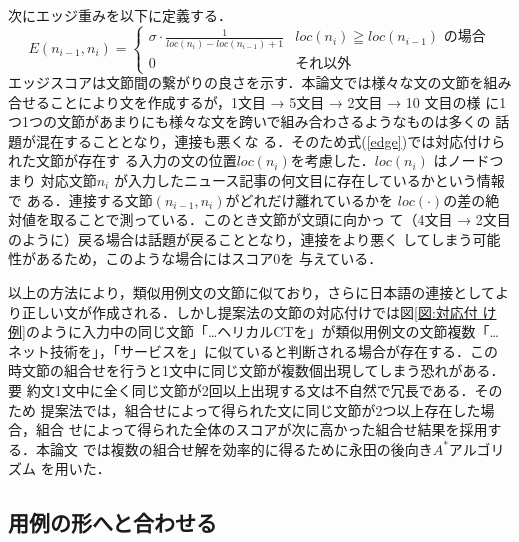 \documentclass[japanese]{jnlp_1.4}
\begin{document}
次にエッジ重みを以下に定義する．
\begin{equation}
 E(n_{i-1},n_i)=
  \begin{cases}
	\sigma\cdot\frac{1}{loc(n_{i})-loc(n_{i-1})+1} 
		& \text{$\mathit{loc}(n_{i}) \geqq \mathit{loc}(n_{i-1})$ の場合}\\
	0 & \text{それ以外}
  \end{cases}
  \label{edge}
\end{equation}
エッジスコアは文節間の繋がりの良さを示す．本論文では様々な文の文節を組み
合せることにより文を作成するが，1文目 → 5文目 → 2文目 → 10 文目の様
に1つ1つの文節があまりにも様々な文を跨いで組み合わさるようなものは多くの
話題が混在することとなり，連接も悪くな
る．そのため式(\ref{edge})では対応付けられた文節が存在す
る入力の文の位置$\mathit{loc}(n_i)$を考慮した．$\mathit{loc}(n_i)$ はノードつまり
対応文節$n_i$ が入力したニュース記事の何文目に存在しているかという情報で
ある．連接する文節$(n_{i-1},n_i)$がどれだけ離れているかを
$\mathit{loc}(\cdot)$の差の絶対値を取ることで測っている．このとき文節が文頭に向かっ
て（4文目 → 2文目のように）戻る場合は話題が戻ることとなり，連接をより悪く
してしまう可能性があるため，このような場合にはスコア0を
与えている．

以上の方法により，類似用例文の文節に似ており，さらに日本語の連接としてよ
り正しい文が作成される．しかし提案法の文節の対応付けでは図\ref{図:対応付
け例}のように入力中の同じ文節「…ヘリカルCTを」が類似用例文の文節複数「…
ネット技術を」，「サービスを」に似ていると判断される場合が存在する．この
時文節の組合せを行うと1文中に同じ文節が複数個出現してしまう恐れがある．要
約文1文中に全く同じ文節が2回以上出現する文は不自然で冗長である．そのため
提案法では，組合せによって得られた文に同じ文節が2つ以上存在した場合，組合
せによって得られた全体のスコアが次に高かった組合せ結果を採用する．本論文
では複数の組合せ解を効率的に得るために永田の後向き$A^*$アルゴリズム
\cite{永田:1999論文}を用いた．





\makeatletter
\def\footnotemark{}
\def\footnotetext{}
\makeatother

\subsection{用例の形へと合わせる}\label{節:用例の形へ合わせる}
\end{document}
